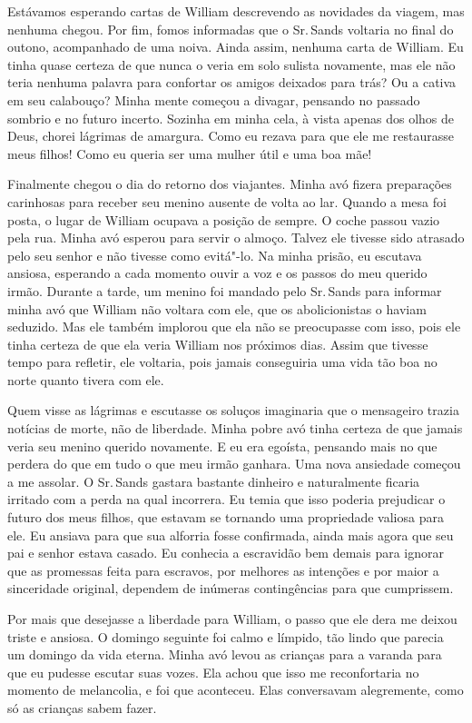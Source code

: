 Estávamos esperando cartas de William
descrevendo as novidades da viagem, mas nenhuma chegou. Por fim, fomos
informadas que o Sr.\,Sands voltaria no final do outono, acompanhado de
uma noiva. Ainda assim, nenhuma carta de William. Eu tinha quase certeza
de que nunca o veria em solo sulista novamente, mas ele não teria
nenhuma palavra para confortar os amigos deixados para trás? Ou a cativa
em seu calabouço? Minha mente começou a divagar, pensando no passado
sombrio e no futuro incerto. Sozinha em minha cela, à vista apenas dos
olhos de Deus, chorei lágrimas de amargura. Como eu rezava para que ele
me restaurasse meus filhos! Como eu queria ser uma mulher útil e uma boa
mãe!

Finalmente chegou o dia do retorno dos
viajantes. Minha avó fizera preparações carinhosas para receber seu
menino ausente de volta ao lar. Quando a mesa foi posta, o lugar de
William ocupava a posição de sempre. O coche passou vazio pela rua.
Minha avó esperou para servir o almoço. Talvez ele tivesse sido atrasado
pelo seu senhor e não tivesse como evitá"-lo. Na minha prisão, eu
escutava ansiosa, esperando a cada momento ouvir a voz e os passos do
meu querido irmão. Durante a tarde, um menino foi mandado pelo Sr.\,Sands
para informar minha avó que William não voltara com ele, que os
abolicionistas o haviam seduzido. Mas ele também implorou que ela não se
preocupasse com isso, pois ele tinha certeza de que ela veria William
nos próximos dias. Assim que tivesse tempo para refletir, ele voltaria,
pois jamais conseguiria uma vida tão boa no norte quanto tivera com ele.

Quem visse as lágrimas e escutasse os
soluços imaginaria que o mensageiro trazia notícias de morte, não de
liberdade. Minha pobre avó tinha certeza de que jamais veria seu menino
querido novamente. E eu era egoísta, pensando mais no que perdera do que
em tudo o que meu irmão ganhara. Uma nova ansiedade começou a me
assolar. O Sr.\,Sands gastara bastante dinheiro e naturalmente ficaria
irritado com a perda na qual incorrera. Eu temia que isso poderia
prejudicar o futuro dos meus filhos, que estavam se tornando uma
propriedade valiosa para ele. Eu ansiava para que sua alforria fosse
confirmada, ainda mais agora que seu pai e senhor estava casado. Eu
conhecia a escravidão bem demais para ignorar que as promessas feita
para escravos, por melhores as intenções e por maior a sinceridade
original, dependem de inúmeras contingências para que cumprissem.

Por mais que desejasse a liberdade para
William, o passo que ele dera me deixou triste e ansiosa. O domingo
seguinte foi calmo e límpido, tão lindo que parecia um domingo da vida
eterna. Minha avó levou as crianças para a varanda para que eu pudesse
escutar suas vozes. Ela achou que isso me reconfortaria no momento de
melancolia, e foi que aconteceu. Elas conversavam alegremente, como só
as crianças sabem fazer.

